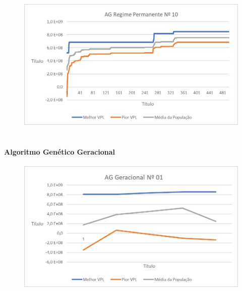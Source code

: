 \documentclass[12pt,a4paper]{report}
\begin{document}
\begin{figure}[H]
\centering

\includegraphics[scale=1]{ApB/AGRP/10}

\end{figure}

\chapter{}
\subsubsection{Algoritmo Genético Geracional}

\begin{figure}[H]
\centering

\includegraphics[scale=1]{ApC/AGG/1}

\end{figure}
\end{document}
